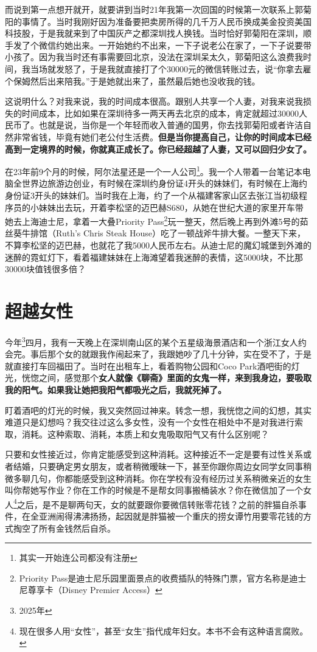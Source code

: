 而说到第一点想开就开，就要讲到当时21年我第一次回国的时候第一次联系上郭菊阳的事情了。当时我刚好因为准备要把卖房所得的几千万人民币换成美金投资美国科技股，于是我就来到了中国灰产之都深圳找人换钱。当时恰好郭菊阳在深圳，顺手发了个微信约她出来。一开始她约不出来，一下子说老公在家了，一下子说要带小孩了。因为我当时还有事需要回北京，没法在深圳呆太久，郭菊阳这么浪费我时间，我当场就发怒了，于是我就直接打了个30000元的微信转账过去，说``你拿去雇个保姆然后出来陪我。''于是她就出来了，虽然最后她也没收我的钱。

这说明什么？对我来说，我的时间成本很高。跟别人共享一个人妻，对我来说我损失的时间成本，比如如果在深圳待多一两天再去北京的成本，肯定就超过30000人民币了。也就是说，当你是一个年轻而收入普通的国男，你去找郭菊阳或者许洁自然非常省钱，毕竟有她们老公付生活费。\textbf{但是当你提高自己，让你的时间成本已经高到一定境界的时候，你就真正成长了。你已经超越了人妻，又可以回归少女了。}

在23年前9个月的时候，阿尔法星还是一个一人公司\footnote{其实一开始连公司都没有注册}。我一个人带着一台笔记本电脑全世界边旅游边创业，有时候在深圳约身份证4开头的妹妹们，有时候在上海约身份证3开头的妹妹们。当时我在上海，约了一个从福建客家山区去张江当初级程序员的小妹妹出去玩，开着李松坚的迈巴赫S680，从她在世纪大道的家里开车带她去上海迪士尼，拿着一大叠Priority Pass\footnote{Priority Pass是迪士尼乐园里面景点的收费插队的特殊门票，官方名称是迪士尼尊享卡（Disney Premier Access）}玩一整天，然后晚上再到外滩5号的茹丝葵牛排馆（Ruth's Chris Steak House）吃了一顿战斧牛排大餐。一整天下来，不算李松坚的迈巴赫，也就花了我5000人民币左右。从迪士尼的魔幻城堡到外滩的迷醉的霓虹灯下，看着福建妹妹在上海滩望着我迷醉的表情，这5000块，不比那30000块值钱很多倍？

\section{超越女性}

今年\footnote{2025年}四月，我有一天晚上在深圳南山区的某个五星级海景酒店和一个浙江女人约会完。事后那个女的就跟我作闹起来了，我跟她吵了几十分钟，实在受不了，于是就直接打车回福田了。当时在出租车上，看着购物公园和Coco Park酒吧街的灯光，恍惚之间，感觉那个\textbf{女人就像《聊斋》里面的女鬼一样，来到我身边，要吸取我的阳气。如果我让她把我阳气都吸光之后，我就死掉了。}

盯着酒吧的灯光的时候，我又突然回过神来。转念一想，我恍惚之间的幻想，其实难道只是幻想吗？我交往过这么多女性，没有一个女性在相处中不是对我进行索取，消耗。这种索取、消耗，本质上和女鬼吸取阳气又有什么区别呢？

只要和女性接近过，你肯定能感受到这种消耗。这种接近不一定是要有过性关系或者结婚，只要确定男女朋友，或者稍微暧昧一下，甚至你跟你周边女同学女同事稍微多聊几句，你都能感受到这种消耗。你在学校有没有经历过关系稍微亲近的女生叫你帮她写作业？你在工作的时候是不是帮女同事搬桶装水？你在微信加了一个女人\footnote{现在很多人用``女性''，甚至``女生''指代成年妇女。本书不会有这种语言腐败。}之后，是不是聊两句天，女的就要跟你要微信转账零花钱？之前的胖猫自杀事件，在全亚洲闹得沸沸扬扬，起因就是胖猫被一个重庆的捞女谭竹用要零花钱的方式掏空了所有金钱然后自杀。

